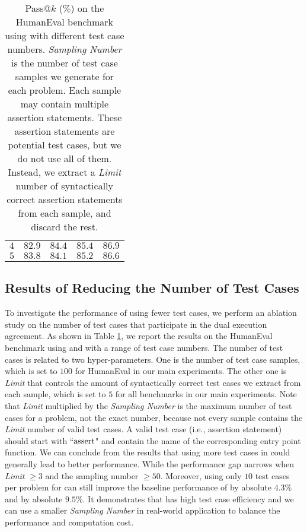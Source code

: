 \begin{table}[t]
\begin{subtable}[t]{0.325\linewidth}
{\begin{tabular}{cllll}
            $4$ & $82.9$ & $84.4$ & $85.4$ & $86.9$ \\
            $5$ & $83.8$ & $84.1$ & $85.2$ & $86.6$ \\
            \bottomrule
            \end{tabular}
        }
        \caption{}
	\end{subtable}
    \caption{Pass@$k$ ($\%$) on the HumanEval benchmark using \ours with different test case numbers. \textit{Sampling Number} is the number of test case samples we generate for each problem. Each sample may contain multiple assertion statements. These assertion statements are potential test cases, but we do not use all of them. Instead, we extract a \textit{Limit} number of syntactically correct assertion statements from each sample, and discard the rest.}
    \label{tab:differ_test_case_number}
\end{table}

\subsection{Results of Reducing the Number of Test Cases}
\label{appendix_test_case_number}
To investigate the performance of \ours using fewer test cases, we perform an ablation study on the number of test cases that participate in the dual execution agreement. As shown in Table \ref{tab:differ_test_case_number}, we report the results on the HumanEval benchmark using \cushman and \davincitwo with a range of test case numbers. The number of test cases is related to two hyper-parameters. One is the number of test case samples, which is set to $100$ for HumanEval in our main experiments. The other one is \textit{Limit} that controls the amount of syntactically correct test cases we extract from each sample, which is set to $5$ for all benchmarks in our main experiments.  Note that \textit{Limit} multiplied by the \textit{Sampling Number} is the maximum number of test cases for a problem, not the exact number, because not every sample contains the \textit{Limit} number of valid test cases. A valid test case (i.e., assertion statement) should start with ``${\rm assert}$" and contain the name of the corresponding entry point function.
We can conclude from the results that using more test cases in \ours could generally lead to better performance. While the performance gap narrows when \textit{Limit} $\geq 3$ and the sampling number $\geq 50$. Moreover, using only $10$ test cases per problem for \ours can still improve the baseline  performance of \cushman by absolute $4.3\%$ and \davincitwo by absolute $9.5\%$. It demonstrates that \ours has high test case efficiency and we can use a smaller \textit{Sampling Number} in real-world application to balance the performance and computation cost.




